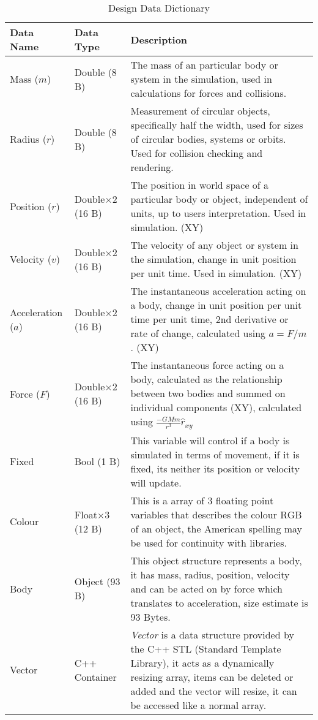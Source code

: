 \begin{table}[H]
\caption{Design Data Dictionary}
\centering
\footnotesize
\def\arraystretch{1.5}
\begin{tabular}{|M{3cm}|M{3cm}|m{8cm}|}
\hline 
\textbf{Data Name} & \textbf{Data Type} & \textbf{Description} \\ \hline
Mass ($m$) & Double (8 B) & The mass of an particular body or system in the simulation, used in calculations for forces and collisions. \\ \hline
Radius ($r$) & Double (8 B) & Measurement of circular objects, specifically half the width, used for sizes of circular bodies, systems or orbits. Used for collision checking and rendering. \\ \hline
Position ($r$) & Double$\times2$ (16 B) & The position in world space of a particular body or object, independent of units, up to users interpretation. Used in simulation. (XY) \\ \hline
Velocity ($v$) & Double$\times2$ (16 B) & The velocity of any object or system in the simulation, change in unit position per unit time. Used in simulation. (XY) \\ \hline
Acceleration ($a$) & Double$\times2$ (16 B) & The instantaneous acceleration acting on a body, change in unit position per unit time per unit time, 2nd derivative or rate of change, calculated using $a=F/m$. (XY) \\ \hline
Force ($F$) & Double$\times2$ (16 B) & The instantaneous force acting on a body, calculated as the relationship between two bodies and summed on individual components (XY), calculated using $\frac{-GMm}{r^3}\hat{r}_{xy}$ \\ \hline
Fixed & Bool (1 B) & This variable will control if a body is simulated in terms of movement, if it is fixed, its neither its position or velocity will update. \\ \hline
Colour & Float$\times3$ (12 B) & This is a array of 3 floating point variables that describes the colour RGB of an object, the American spelling may be used for continuity with libraries. \\ \hline
Body & Object (93 B) & This object structure represents a body, it has mass, radius, position, velocity and can be acted on by force which translates to acceleration, size estimate is 93 Bytes. \\ \hline
Vector & C++ Container & \textit{Vector} is a data structure provided by the C++ STL (Standard Template Library), it acts as a dynamically resizing array, items can be deleted or added and the vector will resize, it can be accessed like a normal array. \\ \hline

\end{tabular}
\end{table}
